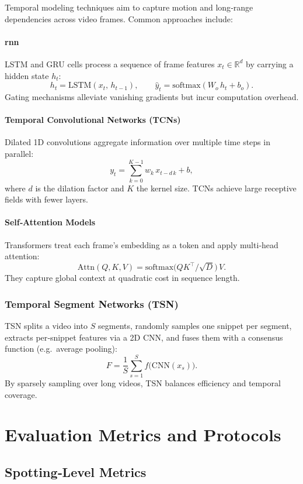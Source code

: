 Temporal modeling techniques aim to capture motion and long‐range dependencies across video frames. Common approaches include: 

\paragraph{\acrfull{rnn}}  
LSTM and GRU cells process a sequence of frame features \(x_t\in\mathbb{R}^d\) by carrying a hidden state \(h_t\):
\[
h_t = \mathrm{LSTM}(x_t,\,h_{t-1}), 
\qquad
\hat y_t = \mathrm{softmax}(W_o\,h_t + b_o).
\]
Gating mechanisms alleviate vanishing gradients but incur computation overhead.

\paragraph{Temporal Convolutional Networks (TCNs)}  
Dilated 1D convolutions aggregate information over multiple time steps in parallel:
\[
y_t = \sum_{k=0}^{K-1} w_k\,x_{t - d\,k} + b,
\]
where \(d\) is the dilation factor and \(K\) the kernel size. TCNs achieve large receptive fields with fewer layers.

\paragraph{Self‐Attention Models}  
Transformers treat each frame’s embedding as a token and apply multi‐head attention:
\[
\mathrm{Attn}(Q,K,V) = \mathrm{softmax}\bigl(QK^\top/\sqrt{D}\bigr)\,V.
\]
They capture global context at quadratic cost in sequence length.

\subsubsection{Temporal Segment Networks (TSN)}  
TSN splits a video into \(S\) segments, randomly samples one snippet per segment, extracts per‐snippet features via a 2D CNN, and fuses them with a consensus function (e.g.\ average pooling):
\[
F = \frac{1}{S}\sum_{s=1}^{S}f\bigl(\mathrm{CNN}(x_s)\bigr).
\]
By sparsely sampling over long videos, TSN balances efficiency and temporal coverage.

\section{Evaluation Metrics and Protocols}
\label{sec:evaluation}

\subsection{Spotting‑Level Metrics}
